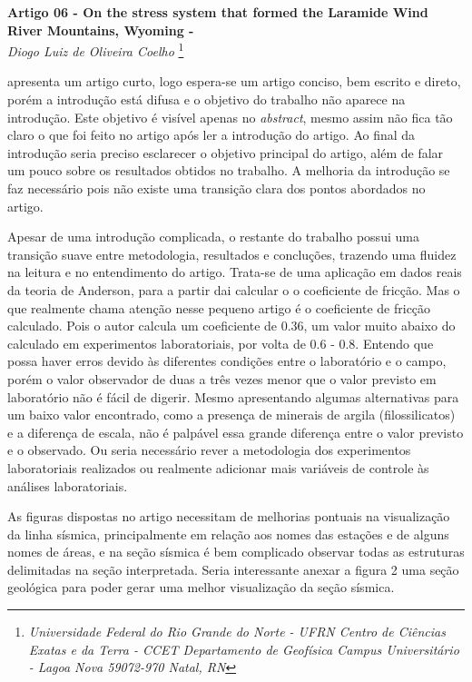 \documentclass[manuscript]{geophysics}
\begin{document}
\begin{center}
\textbf{\LARGE
 Artigo 06 - On the stress system that formed the Laramide Wind River Mountains, Wyoming - \cite{brewer_stress_1980}} \\
\textit{Diogo Luiz de Oliveira Coelho}
\footnote{\textit{Universidade Federal do Rio Grande do Norte - UFRN
Centro de Ciências Exatas e da Terra - CCET
Departamento de Geofísica
Campus Universitário - Lagoa Nova
59072-970 Natal, RN}}
\end{center} 

\cite{brewer_stress_1980} apresenta um artigo curto, logo espera-se um artigo conciso, bem escrito e direto, porém a introdução está difusa e o objetivo do trabalho não aparece na introdução. Este objetivo é visível apenas no \textit{abstract}, mesmo assim não fica tão claro o que foi feito no artigo após ler a introdução do artigo. Ao final da introdução seria preciso esclarecer o objetivo principal do artigo, além de falar um pouco sobre os resultados obtidos no trabalho. A melhoria da introdução se faz necessário pois não existe uma transição clara dos pontos abordados no artigo.

Apesar de uma introdução complicada, o restante do trabalho possui uma transição suave entre metodologia, resultados e concluções, trazendo uma fluidez na leitura e no entendimento do artigo. Trata-se de uma aplicação em dados reais da teoria de Anderson, para a partir dai calcular o o coeficiente de fricção. Mas o que realmente chama atenção nesse pequeno artigo é o coeficiente de fricção calculado. Pois o autor calcula um coeficiente de 0.36, um valor muito abaixo do calculado em experimentos laboratoriais, por volta de 0.6 - 0.8. Entendo que possa haver erros devido às diferentes condições entre o laboratório e o campo, porém o valor observador de duas a três vezes menor que o valor previsto em laboratório não é fácil de digerir. Mesmo apresentando algumas alternativas para um baixo valor encontrado, como a presença de minerais de argila (filossilicatos) e a diferença de escala, não é palpável essa grande diferença entre o valor previsto e o observado. Ou seria necessário rever a metodologia dos experimentos laboratoriais realizados ou realmente adicionar mais variáveis de controle às análises laboratoriais.

As figuras dispostas no artigo necessitam de melhorias pontuais na visualização da linha sísmica, principalmente em relação aos nomes das estações e de alguns nomes de áreas, e na seção sísmica é bem complicado observar todas as estruturas delimitadas na seção interpretada. Seria interessante anexar a figura 2 uma seção geológica para poder gerar uma melhor visualização da seção sísmica.



    
\end{document}
